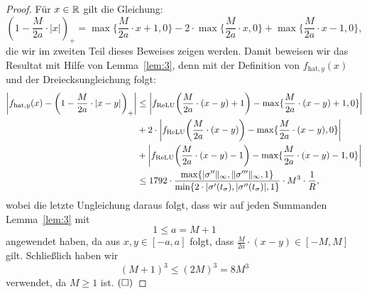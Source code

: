   \begin{proof}
  Für $x \in \mathbb{R}$ gilt die Gleichung:
\begin{equation}
\label{lem:4:eq}
 (1 - \frac{M}{2a} \cdot |x|)_+ = \max\{\frac{M}{2a} \cdot x + 1, 0\} - 2 \cdot \max\{\frac{M}{2a} \cdot x, 0\} + \max\{\frac{M}{2a} \cdot x - 1, 0\}, 
 \end{equation}  
die wir im zweiten Teil dieses Beweises zeigen werden. Damit beweisen wir das Resultat mit Hilfe von Lemma~\ref{lem:3}, denn mit der Definition von $f_{\mathrm{hat},y}(x)$ und der Dreiecksungleichung folgt:
\begin{equation*}
\begin{split}
\bigg|f_{\mathrm{hat},y}(x) - \bigg(1 - \frac{M}{2a} \cdot |x - y|\bigg)_+\bigg| & \leq \bigg|f_{\mathrm{ReLU}} \bigg(\frac{M}{2a} \cdot (x - y) + 1\bigg) - \max\{\frac{M}{2a} \cdot (x - y) + 1, 0\}\bigg| \\ 
& + 2 \cdot \bigg|f_{\mathrm{ReLU}}\bigg(\frac{M}{2a} \cdot (x - y)\bigg) - \max\{\frac{M}{2a} \cdot (x - y), 0\}\bigg| \\
& + \bigg|f_{\mathrm{ReLU}}\bigg(\frac{M}{2a} \cdot (x - y) - 1\bigg) - \max\{\frac{M}{2a} \cdot (x - y) - 1, 0\}\bigg|\\ 
& \leq 1792 \cdot \frac{\max\{|\sigma''\|_{\infty}, \|\sigma'''\|_{\infty}, 1\}}{\min\{2 \cdot |\sigma'(t_{\sigma}), |\sigma''(t_{\sigma})|, 1\}} \cdot M^3 \cdot \frac{1}{R},
\end{split}
\end{equation*} 
wobei die letzte Ungleichung daraus folgt, dass wir auf jeden Summanden Lemma~\ref{lem:3} mit $$1 \leq a = M + 1$$ angewendet haben, da aus $x , y \in [-a, a]$ folgt, dass $\frac{M}{2a}\cdot (x - y) \in [-M, M]$ gilt. Schließlich haben wir
$$ (M + 1)^3 \leq (2M)^3 = 8M^3$$ verwendet, da $M \geq 1$ ist. $\hfill(\square)$


\end{proof}
